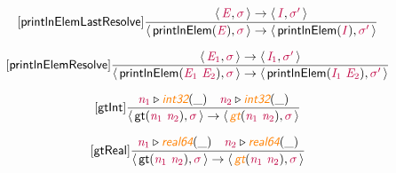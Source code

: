 \documentclass[10pt,leqno,fleqn]{article}
\newcommand{\artVariable}[1]{\mbox{\color{purple}\em #1\/}}
\newcommand{\artConstructor}[1]{\mbox{\sf #1}}
\newcommand{\artSpecial}[1]{\mbox{\color{orange}\sf\em #1}}
\begin{document}
\begin{equation}
\tag*{[\artConstructor{\sf printlnElemLastResolve}]}
\begin{split}\frac{\langle\, \artVariable{E}, \artVariable{$\sigma$}\,\rangle \rightarrow \langle\, \artVariable{I}, \artVariable{$\sigma$\/$^\prime$}\,\rangle }{\langle\, \artConstructor{\sf printlnElem}(\artVariable{E}), \artVariable{$\sigma$}\,\rangle \rightarrow \langle\, \artConstructor{\sf printlnElem}(\artVariable{I}), \artVariable{$\sigma$\/$^\prime$}\,\rangle }
\end{split}
\end{equation}

\begin{equation}
\tag*{[\artConstructor{\sf printlnElemResolve}]}
\begin{split}\frac{\langle\, \artVariable{E$_{1}$}, \artVariable{$\sigma$}\,\rangle \rightarrow \langle\, \artVariable{I$_{1}$}, \artVariable{$\sigma$\/$^\prime$}\,\rangle }{\langle\, \artConstructor{\sf printlnElem}(\artVariable{E$_{1}$}\ \artVariable{E$_{2}$}), \artVariable{$\sigma$}\,\rangle \rightarrow \langle\, \artConstructor{\sf printlnElem}(\artVariable{I$_{1}$}\ \artVariable{E$_{2}$}), \artVariable{$\sigma$\/$^\prime$}\,\rangle }
\end{split}
\end{equation}

\begin{equation}
\tag*{[\artConstructor{\sf gtInt}]}
\begin{split}\frac{ \artVariable{n$_{1}$}\triangleright \artSpecial{int32}(\_) \quad  \artVariable{n$_{2}$}\triangleright \artSpecial{int32}(\_) }{\langle\, \artConstructor{\sf gt}(\artVariable{n$_{1}$}\ \artVariable{n$_{2}$}), \artVariable{$\sigma$}\,\rangle \rightarrow \langle\, \artSpecial{gt}(\artVariable{n$_{1}$}\ \artVariable{n$_{2}$}), \artVariable{$\sigma$}\,\rangle }
\end{split}
\end{equation}

\begin{equation}
\tag*{[\artConstructor{\sf gtReal}]}
\begin{split}\frac{ \artVariable{n$_{1}$}\triangleright \artSpecial{real64}(\_) \quad  \artVariable{n$_{2}$}\triangleright \artSpecial{real64}(\_) }{\langle\, \artConstructor{\sf gt}(\artVariable{n$_{1}$}\ \artVariable{n$_{2}$}), \artVariable{$\sigma$}\,\rangle \rightarrow \langle\, \artSpecial{gt}(\artVariable{n$_{1}$}\ \artVariable{n$_{2}$}), \artVariable{$\sigma$}\,\rangle }
\end{split}
\end{equation}
\end{document}
